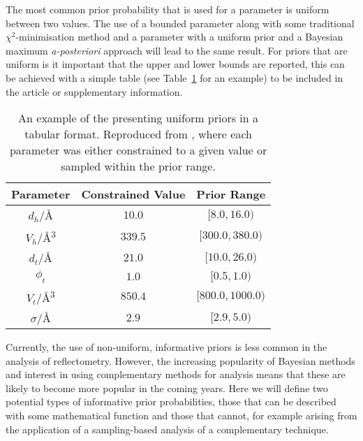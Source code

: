 \documentclass[reprint,superscriptaddress,aps,amsmath,linenumbers]{revtex4-2}
\begin{document}
The most common prior probability that is used for a parameter is uniform between two values.
The use of a bounded parameter along with some traditional $\chi^2$-minimisation method and a parameter with a uniform prior and a Bayesian maximum \emph{a-posteriori} approach will lead to the same result. 
For priors that are uniform is it important that the upper and lower bounds are reported, this can be achieved with a simple table  (see Table~\ref{tab:bounds} for an example) to be included in the article or supplementary information. 
%
\begin{table}
    \caption{An example of the presenting uniform priors in a tabular format. Reproduced from \cite{mccluskey_general_2020}, where each parameter was either constrained to a given value or sampled within the prior range.}
    \label{tab:bounds}
    \begin{tabular}{c| c | c}
        Parameter & Constrained Value & Prior Range \\ 
        \hline
        $d_h$/\si{\angstrom} & $10.0$ & $[8.0, 16.0)$\\
        $V_h$/\si{\angstrom^3} & $339.5$ & $[300.0, 380.0)$\\
        $d_t$/\si{\angstrom} & $21.0$ & $[10.0, 26.0)$\\
        $\phi_t$ & $1.0$ & $[0.5, 1.0)$\\
        $V_t$/\si{\angstrom^3} & $850.4$ & $[800.0, 1000.0)$\\
        $\sigma$/\si{\angstrom} & $2.9$ & $[2.9, 5.0)$\\
    \end{tabular}
\end{table}
%

Currently, the use of non-uniform, informative priors is less common in the analysis of reflectometry. 
However, the increasing popularity of Bayesian methods and interest in using complementary methods for analysis means that these are likely to become more popular in the coming years. 
Here we will define two potential types of informative prior probabilities, those that can be described with some mathematical function and those that cannot, for example arising from the application of a sampling-based analysis of a complementary technique. 
\end{document}
